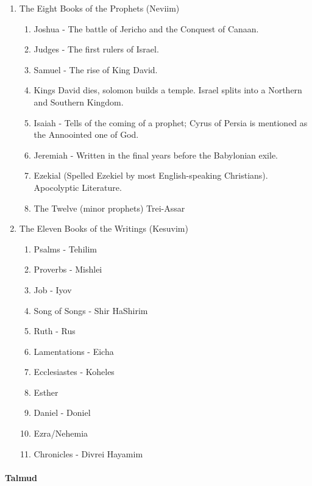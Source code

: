 \begin{enumerate}
\begin{enumerate}
					\end{enumerate}
					\item The Eight Books of the Prophets (Neviim)
						\begin{enumerate}
							\item Joshua - The battle of Jericho and the Conquest of Canaan. 
							\item Judges - The first rulers of Israel.
							\item Samuel - The rise of King David. 
							\item Kings David dies, solomon builds a temple. Israel splits into a Northern and Southern Kingdom. 
							\item Isaiah - Tells of the coming of a prophet; Cyrus of Persia is mentioned as the Annoointed one of God. 
							\item Jeremiah - Written in the final years before the Babylonian exile.
							\item Ezekial (Spelled Ezekiel by most English-speaking Christians).  Apocolyptic Literature. 
							\item The Twelve (minor prophets) Trei-Assar 
						\end{enumerate}
					\item The Eleven Books of the Writings (Kesuvim)
						\begin{enumerate}
							\item Psalms - Tehilim
							\item Proverbs - Mishlei
							\item Job - Iyov
							\item Song of Songs - Shir HaShirim
							\item Ruth - Rus
							\item Lamentations - Eicha
							\item Ecclesiastes - Koheles
							\item Esther
							\item Daniel - Doniel
							\item Ezra/Nehemia
							\item Chronicles - Divrei Hayamim 
						\end{enumerate}
					
				\end{enumerate}

				\paragraph{Talmud}
				

